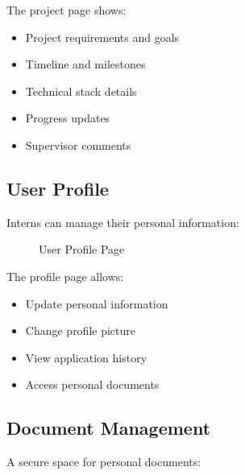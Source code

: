 The project page shows:
\begin{itemize}
    \item Project requirements and goals
    \item Timeline and milestones
    \item Technical stack details
    \item Progress updates
    \item Supervisor comments
\end{itemize}

\subsection{User Profile}
\noindent
Interns can manage their personal information:

\begin{figure}[H]
    \centering
    \caption{User Profile Page}
    \label{fig:profile}
\end{figure}

The profile page allows:
\begin{itemize}
    \item Update personal information
    \item Change profile picture
    \item View application history
    \item Access personal documents
\end{itemize}

\subsection{Document Management}
\noindent
A secure space for personal documents:

